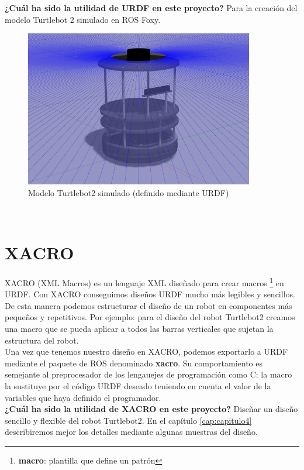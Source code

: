 \textbf{¿Cuál ha sido la utilidad de URDF en este proyecto?} Para la creación del modelo Turtlebot 2 simulado en ROS Foxy.
\begin{figure} [H]
  \begin{center}
    \includegraphics[width=10cm]{imagenes/turtlebot2-sim.png}
  \end{center}
  \caption{Modelo Turtlebot2 simulado (definido mediante URDF)}
  \label{fig:ros_master_comunicación}
\end{figure}\




\section{XACRO}
\label{sec:xacro}

XACRO (XML Macros) es un lenguaje XML diseñado para crear macros \footnote{\textbf{macro}: plantilla que define un patrón} en URDF. Con XACRO conseguimos diseños URDF mucho más legibles y sencillos. De esta manera podemos estructurar el diseño de un robot en componentes más pequeños y repetitivos. Por ejemplo: para el diseño del robot Turtlebot2 creamos una macro que se pueda aplicar a todos las barras verticales que sujetan la estructura del robot.\\

Una vez que tenemos nuestro diseño en XACRO, podemos exportarlo a URDF mediante el paquete de ROS denominado \textbf{xacro}. Su comportamiento es semejante al preprocesador de los lengauejes de programación como C: la macro la sustituye por el código URDF deseado teniendo en cuenta el valor de la variables que haya definido el programador.\\

\textbf{¿Cuál ha sido la utilidad de XACRO en este proyecto?} Diseñar un diseño sencillo y flexible del robot Turtlebot2. En el capítulo \ref{cap:capitulo4} describiremos mejor los detalles mediante algunas muestras del diseño.\\




